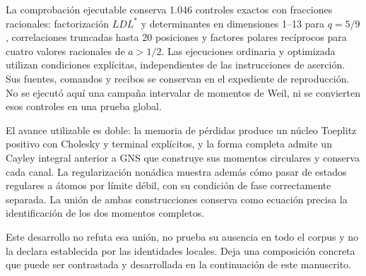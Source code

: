 % 
La comprobación ejecutable conserva 1.046 controles exactos con fracciones racionales: factorización \(LDL^*\) y determinantes en dimensiones 1–13 para \(q=5/9\), correlaciones truncadas hasta 20 posiciones y factores polares recíprocos para cuatro valores racionales de \(a>1/2\). Las ejecuciones ordinaria y optimizada utilizan condiciones explícitas, independientes de las instrucciones de aserción. Sus fuentes, comandos y recibos se conservan en el expediente de reproducción. No se ejecutó aquí una campaña intervalar de momentos de Weil, ni se convierten esos controles en una prueba global.

El avance utilizable es doble: la memoria de pérdidas produce un núcleo Toeplitz positivo con Cholesky y terminal explícitos, y la forma completa admite un Cayley integral anterior a GNS que construye sus momentos circulares y conserva cada canal. La regularización nonádica muestra además cómo pasar de estados regulares a átomos por límite débil, con su condición de fase correctamente separada. La unión de ambas construcciones conserva como ecuación precisa la identificación de los dos momentos completos.

Este desarrollo no refuta esa unión, no prueba su ausencia en todo el corpus y no la declara establecida por las identidades locales. Deja una composición concreta que puede ser contrastada y desarrollada en la continuación de este manuscrito.
